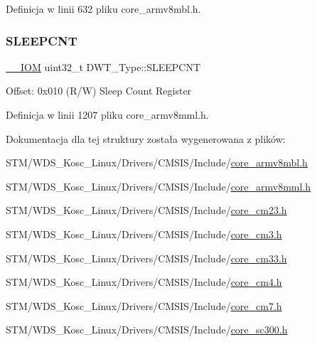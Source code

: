 Definicja w linii 632 pliku core\+\_\+armv8mbl.\+h.

\mbox{\label{struct_d_w_t___type_a416a54e2084ce66e5ca74f152a5ecc70}} 
\subsubsection{\texorpdfstring{S\+L\+E\+E\+P\+C\+NT}{SLEEPCNT}}
{\footnotesize\ttfamily \hyperlink{core__sc300_8h_ab6caba5853a60a17e8e04499b52bf691}{\+\_\+\+\_\+\+I\+OM} uint32\+\_\+t D\+W\+T\+\_\+\+Type\+::\+S\+L\+E\+E\+P\+C\+NT}

Offset\+: 0x010 (R/W) Sleep Count Register 

Definicja w linii 1207 pliku core\+\_\+armv8mml.\+h.



Dokumentacja dla tej struktury została wygenerowana z plików\+:\begin{DoxyCompactItemize}
\item 
S\+T\+M/\+W\+D\+S\+\_\+\+Kosc\+\_\+\+Linux/\+Drivers/\+C\+M\+S\+I\+S/\+Include/\hyperlink{core__armv8mbl_8h}{core\+\_\+armv8mbl.\+h}\item 
S\+T\+M/\+W\+D\+S\+\_\+\+Kosc\+\_\+\+Linux/\+Drivers/\+C\+M\+S\+I\+S/\+Include/\hyperlink{core__armv8mml_8h}{core\+\_\+armv8mml.\+h}\item 
S\+T\+M/\+W\+D\+S\+\_\+\+Kosc\+\_\+\+Linux/\+Drivers/\+C\+M\+S\+I\+S/\+Include/\hyperlink{core__cm23_8h}{core\+\_\+cm23.\+h}\item 
S\+T\+M/\+W\+D\+S\+\_\+\+Kosc\+\_\+\+Linux/\+Drivers/\+C\+M\+S\+I\+S/\+Include/\hyperlink{core__cm3_8h}{core\+\_\+cm3.\+h}\item 
S\+T\+M/\+W\+D\+S\+\_\+\+Kosc\+\_\+\+Linux/\+Drivers/\+C\+M\+S\+I\+S/\+Include/\hyperlink{core__cm33_8h}{core\+\_\+cm33.\+h}\item 
S\+T\+M/\+W\+D\+S\+\_\+\+Kosc\+\_\+\+Linux/\+Drivers/\+C\+M\+S\+I\+S/\+Include/\hyperlink{core__cm4_8h}{core\+\_\+cm4.\+h}\item 
S\+T\+M/\+W\+D\+S\+\_\+\+Kosc\+\_\+\+Linux/\+Drivers/\+C\+M\+S\+I\+S/\+Include/\hyperlink{core__cm7_8h}{core\+\_\+cm7.\+h}\item 
S\+T\+M/\+W\+D\+S\+\_\+\+Kosc\+\_\+\+Linux/\+Drivers/\+C\+M\+S\+I\+S/\+Include/\hyperlink{core__sc300_8h}{core\+\_\+sc300.\+h}\end{DoxyCompactItemize}

